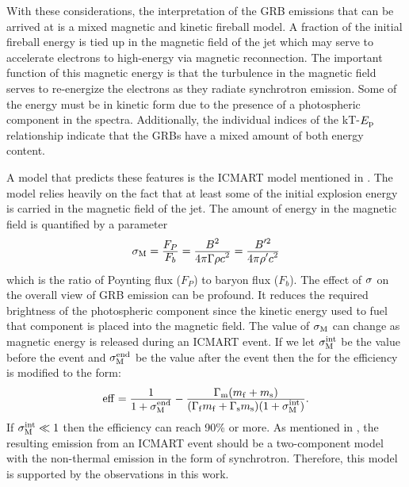 With these considerations, the interpretation of the GRB emissions
that can be arrived at is a mixed magnetic and kinetic fireball
model. A fraction of the initial fireball energy is tied up in the
magnetic field of the jet which may serve to accelerate electrons to
high-energy via magnetic reconnection. The important function of this
magnetic energy is that the turbulence in the magnetic field serves to
re-energize the electrons as they radiate synchrotron emission. Some
of the energy must be in kinetic form due to the presence of a
photospheric component in the spectra. Additionally, the individual
indices of the kT-$E_{\rm p}$ relationship indicate that the GRBs have a
mixed amount of both energy content.

A model that predicts these features is the ICMART model mentioned
in . The model relies heavily on the fact that at
least some of the initial explosion energy is carried in the magnetic
field of the jet. The amount of energy in the magnetic field is
quantified by a parameter
\begin{equation}
  \label{eq:sigM}
  \sigma_{\rm M}=\dover{F_P}{F_b}=\dover{B^2}{4 \pi \Gamma \rho c^2}=\dover{B^{\prime2}}{4 \pi \rho^{\prime}c^2}
\end{equation}
which is the ratio of Poynting flux ($F_P$) to baryon flux
($F_b$). The effect of $\sigma_{\rm}$ on the overall view of GRB
emission can be profound. It reduces the required brightness of the
photospheric component since the kinetic energy used to fuel that
component is placed into the magnetic field. The value of $\sigma_{\rm
  M}$ can change as magnetic energy is released during an ICMART
event. If we let $\sigma_{\rm M}^{\rm int}$ be the value before the
event and $\sigma_{\rm M}^{\rm end}$ be the value after the event then
the  for the efficiency is modified to the form:
\begin{equation}
  \label{eq:si}
  {\rm eff}=\dover{1}{1+\sigma_{\rm M}^{\rm end}}-\dover{\Gamma_{\rm m}(m_{\rm f}+m_{\rm s})}{(\Gamma_{\rm f}m_{\rm f}+\Gamma_{\rm s}m_{\rm s})(1+\sigma_{\rm M}^{\rm int})}.
\end{equation}
If $\sigma_{\rm M}^{\rm int}\ll 1$ then the efficiency can reach 90\%
or more. As mentioned in , the resulting emission
from an ICMART event should be a two-component model with the
non-thermal emission in the form of synchrotron. Therefore, this model
is supported by the observations in this work.


